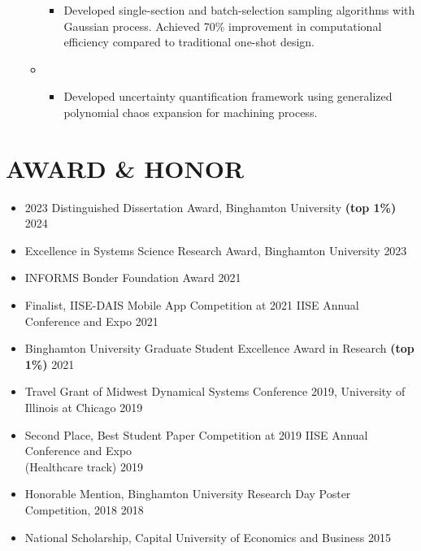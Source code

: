 \documentclass[10pt]{article}
\begin{document}
\begin{itemize}
\begin{itemize}[label=$\bullet$]
\begin{itemize}[label=$\bullet$]
				\item Developed single-section and batch-selection sampling algorithms with Gaussian process. Achieved 70\% improvement in computational efficiency compared to traditional one-shot design.
			\end{itemize}
	    
			\item {}
			\vspace{-0.5em}
			\begin{itemize}[label=$\bullet$]
				\setlength\itemsep{0.5pt}
				\item Developed uncertainty quantification framework using generalized polynomial chaos expansion for machining process.
			\end{itemize}
	\end{itemize}
\end{itemize}


\vspace{-2em}
\section*{AWARD \& HONOR}
\vspace{-0.5em}
\begin{itemize}
	\setlength\itemsep{0.5pt}
	\item 2023 Distinguished Dissertation Award, Binghamton University \textbf{(top 1\%)}
	\hfill{2024}
    \item Excellence in Systems Science Research Award, Binghamton University
	\hfill{2023}
	\item INFORMS Bonder Foundation Award
	\hfill{2021}
	\item Finalist, IISE-DAIS Mobile App Competition at 2021 IISE Annual Conference and Expo
	\hfill{2021}
	\item Binghamton University Graduate Student Excellence Award in Research \textbf{(top 1\%)}
	\hfill{2021}
	\item Travel Grant of Midwest Dynamical Systems Conference 2019, University of Illinois at Chicago 
	\hfill{2019}
	\item Second Place, Best Student Paper Competition at 2019 IISE Annual Conference and Expo \\(Healthcare track)
	\hfill{2019}
	\item Honorable Mention, Binghamton University Research Day Poster Competition, 2018
	\hfill{2018}
	\item National Scholarship, Capital University of Economics and Business
	\hfill{2015}
\end{itemize}
\end{document}

